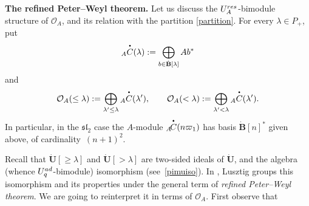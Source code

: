 \documentclass[11pt]{article}
\numberwithin{equation}{section}
\numberwithin{equation}{section}
\theoremstyle{definition}
\newcommand{\Oo}{{\mathcal O}}
\newcommand{\ra}{\rightarrow}
\newcommand{\smallbullet}{%
\vcenter{\hbox{\,\scalebox{0.5}{$\bullet$}\,}}
}
\begin{document}
{\bf The refined Peter--Weyl theorem.} Let us discuss the $U_A^{\rm res}$-bimodule structure of $\Oo_A$, and its relation with the partition \eqref{partition}. For every $\lambda\in P_+$, put
\begin{equation}\label{AClambda}
{}_A \overset{\raisebox{-1.5pt}{\scriptsize$\smallbullet$}}{C} (\lambda) := \bigoplus_{b\in \dot{\mathbf{B}}[\lambda]} Ab^*
\end{equation}
and
\[\Oo_A(\leq \lambda) := \bigoplus_{\lambda'\leq \lambda} {}_A \overset{\raisebox{-1.5pt}{\scriptsize$\smallbullet$}}{C} (\lambda') ,\qquad \Oo_A(< \lambda) := \bigoplus_{\lambda'< \lambda} {}_A \overset{\raisebox{-1.5pt}{\scriptsize$\smallbullet$}}{C} (\lambda').\]
In particular, in the ${\mathfrak{sl}_2}$ case the $A$-module ${}_A\! \overset{\raisebox{-1.5pt}{\scriptsize$\smallbullet$}}{C} (n\varpi_1)$ has basis $\dot{\mathbf{B}} [n]^*$ given above, of cardinality~${(n+1)^2}$.

Recall that $\dot{\mathbf{U}} [\geq \lambda]$ and $\dot{\mathbf{U}} [> \lambda]$ are two-sided ideals of $\dot{\mathbf{U}}$, and the algebra (whence $U_q^{\rm ad}$-bimodule) isomorphism \smash{$\bar{\pi}_\lambda\colon \dot{\mathbf{U}} [\geq \lambda]/ \dot{\mathbf{U}} [> \lambda] \ra {\rm End}(V_\lambda)$} (see~\eqref{pimuiso}). In \cite[Section~29.3]{Lusztig}, Lusz\-tig groups this isomorphism and its properties under the general term of {\it refined Peter--Weyl theorem}. We are going to reinterpret it in terms of $\Oo_A$. First observe that
\end{document}

